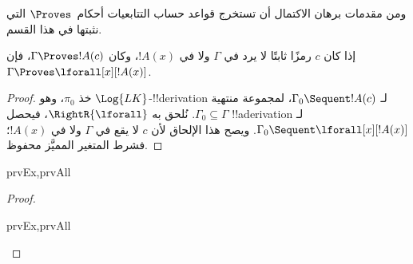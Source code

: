 \documentclass[../../../include/open-logic-section]{subfiles}
\begin{document}

\begin{explain}
  ومن مقدمات برهان الاكتمال أن تستخرج قواعد حساب التتابعيات أحكام~$\Proves$ التي نثبتها في هذا القسم.
\end{explain}

\begin{thm}
 إذا كان $c$ رمزًا ثابتًا لا يرد
في $\Gamma$ ولا في $!A(x)$، وكان $\Gamma \Proves !A(c)$، فإن
$\Gamma \Proves \lforall[x][!A(x)]$.
\end{thm}

\begin{proof}
خذ $\pi_0$، وهو $\Log{LK}$-!!{derivation} لـ
$\Gamma_0 \Sequent !A(c)$، لمجموعة منتهية $\Gamma_0 \subseteq \Gamma$.
نُلحق به $\RightR{\lforall}$، فيحصل !!a{derivation} لـ
$\Gamma_0 \Sequent \lforall[x][!A(x)]$.
ويصح هذا الإلحاق لأن $c$ لا يقع في
$\Gamma$ ولا في $!A(x)$؛ فشرط المتغير المميَّز محفوظ.
\end{proof}

\begin{prop}
\begin{tagenumerate}{prvEx,prvAll}
\end{tagenumerate}
\end{prop}

\begin{proof}
\begin{tagenumerate}{prvEx,prvAll}
\end{tagenumerate}
\end{proof}
\end{document}
